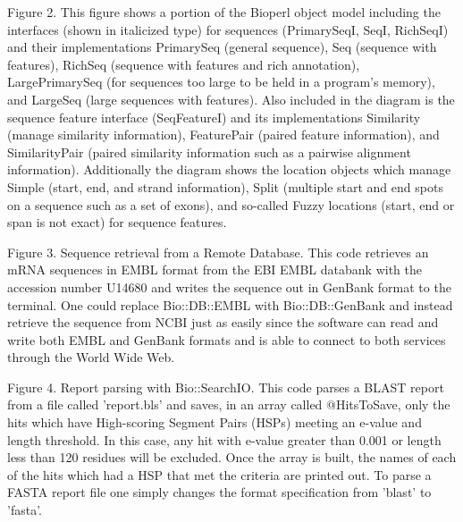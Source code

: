 \documentclass[12pt]{article}
\begin{document}
\newpage


Figure 2. This figure shows a portion of the Bioperl object model
including the interfaces (shown in italicized type) for sequences
(PrimarySeqI, SeqI, RichSeqI) and their implementations PrimarySeq
(general sequence), Seq (sequence with features), RichSeq (sequence
with features and rich annotation), LargePrimarySeq (for sequences too
large to be held in a program's memory), and LargeSeq (large sequences
with features).  Also included in the diagram is the sequence feature
interface (SeqFeatureI) and its implementations Similarity (manage
similarity information), FeaturePair (paired feature information), and
SimilarityPair (paired similarity information such as a pairwise
alignment information).  Additionally the diagram shows the location
objects which manage Simple (start, end, and strand information),
Split (multiple start and end spots on a sequence such as a set of
exons), and so-called Fuzzy locations (start, end or span is not
exact) for sequence features.

\newpage


Figure 3. Sequence retrieval from a Remote Database.  This code
retrieves an mRNA sequences in EMBL format from the EBI EMBL
databank with the accession number U14680 and writes the sequence out
in GenBank format to the terminal.  One could replace Bio::DB::EMBL
with Bio::DB::GenBank and instead retrieve the sequence from NCBI just
as easily since the software can read and write both EMBL and GenBank
formats and is able to connect to both services through the World Wide
Web.

\newpage


Figure 4. Report parsing with Bio::SearchIO.  This code parses a BLAST
report from a file called 'report.bls' and saves, in an array called
@HitsToSave, only the hits which have High-scoring Segment Pairs (HSPs)
meeting an e-value and length threshold.  In this case, any hit with
e-value greater than 0.001 or length less than 120 residues will be
excluded.  Once the array is built, the names of each of the hits
which had a HSP that met the criteria are printed out.  To parse a
FASTA \cite{fasta} report file one simply changes the format
specification from 'blast' to 'fasta'.

\newpage

\singlespacing
\end{document}
